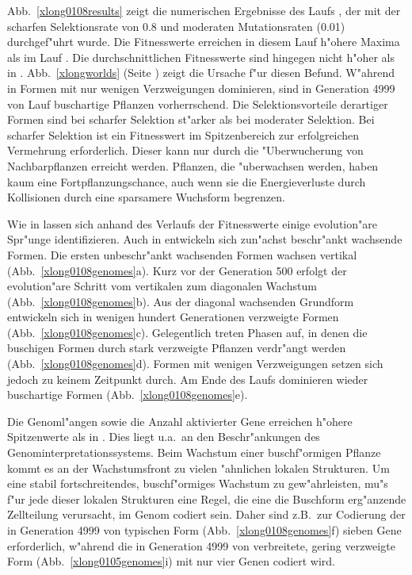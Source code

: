 Abb.\ \ref{xlong0108results} zeigt die numerischen Ergebnisse des Laufs , der
mit der scharfen Selektionsrate von 0.8 und moderaten Mutationsraten (0.01) durchgef"uhrt wurde.
Die Fitnesswerte erreichen in diesem Lauf h"ohere Maxima als im Lauf . Die
durchschnittlichen Fitnesswerte sind hingegen nicht h"oher als in .
Abb.\ \ref{xlongworlds} (Seite \pageref{xlongworlds}) zeigt die Ursache f"ur diesen Befund. W"ahrend in 
Formen mit nur wenigen Verzweigungen dominieren, sind in Generation 4999 von Lauf 
buschartige Pflanzen vorherrschend. Die Selektionsvorteile derartiger Formen sind bei scharfer Selektion
st"arker als bei moderater Selektion. Bei scharfer Selektion ist ein Fitnesswert im Spitzenbereich
zur erfolgreichen Vermehrung erforderlich. Dieser kann nur durch die "Uberwucherung von Nachbarpflanzen
erreicht werden. Pflanzen, die "uberwachsen werden, haben kaum eine Fortpflanzungschance, auch wenn
sie die Energieverluste durch Kollisionen durch eine sparsamere Wuchsform begrenzen.

Wie in  lassen sich anhand des Verlaufs der Fitnesswerte einige evolution"are
Spr"unge identifizieren. Auch in  entwickeln sich zun"achst beschr"ankt wachsende
Formen. Die ersten unbeschr"ankt wachsenden Formen wachsen vertikal (Abb.\ \ref{xlong0108genomes}a).
Kurz vor der Generation 500 erfolgt der evolution"are Schritt vom vertikalen zum diagonalen Wachstum
(Abb.\ \ref{xlong0108genomes}b). Aus der diagonal wachsenden Grundform entwickeln sich in wenigen
hundert Generationen verzweigte Formen (Abb.\ \ref{xlong0108genomes}c). Gelegentlich treten Phasen
auf, in denen die buschigen Formen durch stark verzweigte Pflanzen verdr"angt werden (Abb.\ \ref{xlong0108genomes}d).
Formen mit wenigen Verzweigungen setzen sich jedoch zu keinem Zeitpunkt durch. Am Ende des Laufs dominieren
wieder buschartige Formen (Abb.\ \ref{xlong0108genomes}e). 

Die Genoml"angen sowie die Anzahl aktivierter Gene erreichen h"ohere Spitzenwerte als in .
Dies liegt u.a.\ an den Beschr"ankungen des Genominterpretationssystems. Beim Wachstum einer buschf"ormigen
Pflanze kommt es an der Wachstumsfront zu vielen "ahnlichen lokalen Strukturen. Um eine stabil fortschreitendes,
buschf"ormiges Wachstum zu gew"ahrleisten, mu"s f"ur jede dieser lokalen Strukturen eine Regel, die eine die
Buschform erg"anzende Zellteilung verursacht, im Genom codiert sein. Daher sind z.B.\ zur Codierung der in
Generation 4999 von  typischen Form (Abb.\ \ref{xlong0108genomes}f) sieben Gene erforderlich, w"ahrend
die in Generation 4999 von  verbreitete, gering verzweigte Form (Abb.\ \ref{xlong0105genomes}i)
mit nur vier Genen codiert wird.

